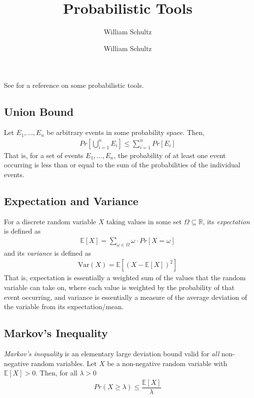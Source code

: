 \documentclass[10pt,a4paper]{article}
\author{William Schultz}
\begin{document}
\title{Probabilistic Tools}
\author{William Schultz}
\maketitle

\newcommand{\expect}[1]{\mathbb{E}\left[#1\right]}
\newcommand{\var}[1]{\text{Var}(#1)}

See \cite{Doerr_2019} for a reference on some probabilistic tools.

\subsection*{Union Bound}

Let $E_1,\dots,E_n$ be arbitrary events in some probability space. Then,
\begin{align*}
    Pr \left[ \bigcup_{i=1}^n E_i \right] \leq \sum_{i=1}^n Pr[E_i]
\end{align*}
That is, for a set of events $E_1,\dots,E_n$, the probability of at least one event occurring is less than or equal to the sum of the probabilities of the individual events.

\subsection*{Expectation and Variance}

For a discrete random variable $X$ taking values in some set $\Omega \subseteq \mathbb{R}$, its \textit{expectation} is defined as
\begin{align*}
    \expect{X} = \sum_{\omega \in \Omega} \omega \cdot Pr\left[X=\omega\right]
\end{align*}
and its \textit{variance} is defined as 
\begin{align*}
    \var{X} = \expect{(X - \expect{X})^2}
\end{align*}
That is, expectation is essentially a weighted sum of the values that the random variable can take on, where each value is weighted by the probability of that event occurring, and variance is essentially a measure of the average deviation of the variable from its expectation/mean.

\subsection*{Markov's Inequality}

\textit{Markov's inequality} is an elementary large deviation bound valid for \textit{all} non-negative random variables. Let $X$ be a non-negative random variable with $\expect{X} > 0$. Then, for all $\lambda > 0$
\begin{align*}
    Pr(X \geq \lambda) \leq \dfrac{\expect{X}}{\lambda}
\end{align*}
\end{document}
